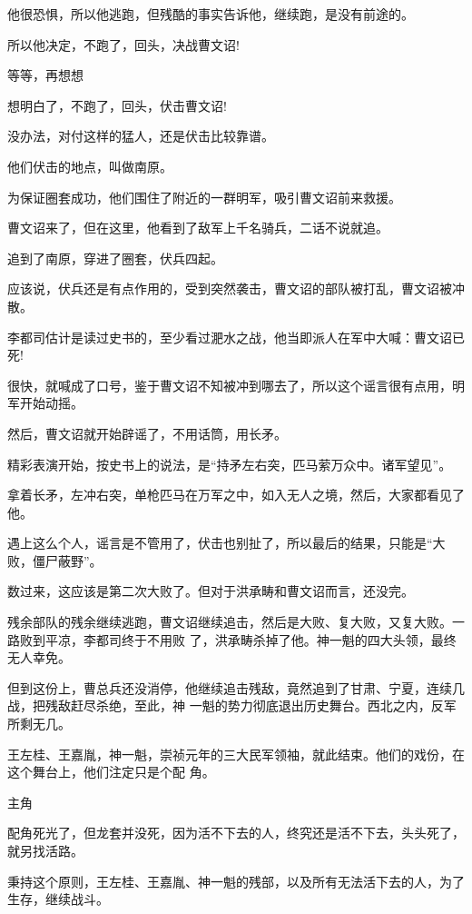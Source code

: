 \documentclass[11pt,a4paper,onecolumn]{article}
\begin{document}
他很恐惧，所以他逃跑，但残酷的事实告诉他，继续跑，是没有前途的。

所以他决定，不跑了，回头，决战曹文诏!

等等，再想想

想明白了，不跑了，回头，伏击曹文诏!

没办法，对付这样的猛人，还是伏击比较靠谱。

他们伏击的地点，叫做南原。

为保证圈套成功，他们围住了附近的一群明军，吸引曹文诏前来救援。

曹文诏来了，但在这里，他看到了敌军上千名骑兵，二话不说就追。

追到了南原，穿进了圈套，伏兵四起。

应该说，伏兵还是有点作用的，受到突然袭击，曹文诏的部队被打乱，曹文诏被冲散。

李都司估计是读过史书的，至少看过淝水之战，他当即派人在军中大喊：曹文诏已死!

很快，就喊成了口号，鉴于曹文诏不知被冲到哪去了，所以这个谣言很有点用，明军开始动摇。

然后，曹文诏就开始辟谣了，不用话筒，用长矛。

精彩表演开始，按史书上的说法，是``持矛左右突，匹马萦万众中。诸军望见''。

拿着长矛，左冲右突，单枪匹马在万军之中，如入无人之境，然后，大家都看见了他。

遇上这么个人，谣言是不管用了，伏击也别扯了，所以最后的结果，只能是``大败，僵尸蔽野''。

数过来，这应该是第二次大败了。但对于洪承畴和曹文诏而言，还没完。

残余部队的残余继续逃跑，曹文诏继续追击，然后是大败、复大败，又复大败。一路败到平凉，李都司终于不用败
了，洪承畴杀掉了他。神一魁的四大头领，最终无人幸免。

但到这份上，曹总兵还没消停，他继续追击残敌，竟然追到了甘肃、宁夏，连续几战，把残敌赶尽杀绝，至此，神
一魁的势力彻底退出历史舞台。西北之内，反军所剩无几。

王左桂、王嘉胤，神一魁，崇祯元年的三大民军领袖，就此结束。他们的戏份，在这个舞台上，他们注定只是个配
角。

主角

配角死光了，但龙套并没死，因为活不下去的人，终究还是活不下去，头头死了，就另找活路。

秉持这个原则，王左桂、王嘉胤、神一魁的残部，以及所有无法活下去的人，为了生存，继续战斗。

\section[\thesection]{}
\end{document}
